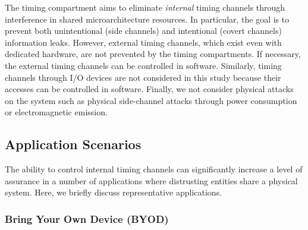 
The timing compartment aims to eliminate {\em internal} timing channels through
interference in shared microarchitecture resources. In particular, the goal is
to prevent both unintentional (side channels) and intentional (covert channels)
information leaks.
However, external timing
channels, which exist even with dedicated hardware, are not prevented by the
timing compartments. If necessary, the external timing channels can be controlled 
in software. 
Similarly, timing channels through I/O devices are not considered in this study
because their accesses can be controlled in software.
Finally, we not consider physical attacks on the system such as
physical side-channel attacks through power consumption or electromagnetic emission. 



\subsection{Application Scenarios}

The ability to control internal timing channels can significantly increase a level of
assurance in a number of applications where distrusting entities share a
physical system. Here, we briefly discuss representative applications.

\subsubsection{Bring Your Own Device (BYOD)}

